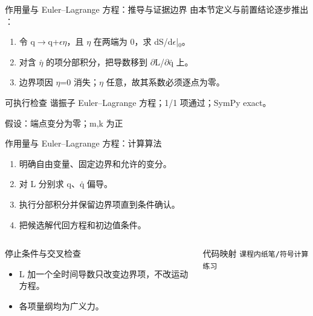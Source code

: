 \begin{frame}[t]{作用量与 Euler--Lagrange 方程：推导与证据边界}
\footnotesize
{}\quad 由本节定义与前置结论逐步推出 ：
\begin{enumerate}
\item 令 q\ensuremath{\rightarrow}q+\ensuremath{\epsilon}\ensuremath{\eta}，且 \ensuremath{\eta} 在两端为 0，求 dS/\allowbreak{}d\ensuremath{\epsilon}|\ensuremath{_{0}}。
\item 对含 \ensuremath{\eta}̇ 的项分部积分，把导数移到 \ensuremath{\partial}L/\allowbreak{}\ensuremath{\partial}q̇ 上。
\item 边界项因 \ensuremath{\eta}=0 消失；\ensuremath{\eta} 任意，故其系数必须逐点为零。
\end{enumerate}\begin{block}{可执行检查}
\quad 谐振子 Euler--Lagrange 方程；1/1 项通过；SymPy exact。
\par\scriptsize 假设：端点变分为零；m,k 为正
\end{block}
\end{frame}

\begin{frame}[t]{作用量与 Euler--Lagrange 方程：计算算法}
\footnotesize
{}\begin{enumerate}
\item 明确自由变量、固定边界和允许的变分。
\item 对 L 分别求 q、q̇ 偏导。
\item 执行分部积分并保留边界项直到条件确认。
\item 把候选解代回方程和初边值条件。
\end{enumerate}\begin{columns}[T,onlytextwidth]
\begin{block}{停止条件与交叉检查}\scriptsize\begin{itemize}
\item[\CheckMark] L 加一个全时间导数只改变边界项，不改运动方程。
\item[\CheckMark] 各项量纲均为广义力。
\end{itemize}\end{block}
\begin{block}{代码映射}
\scriptsize \texttt{课程内纸笔/\allowbreak{}符号计算练习}
\end{block}\end{columns}\end{frame}

